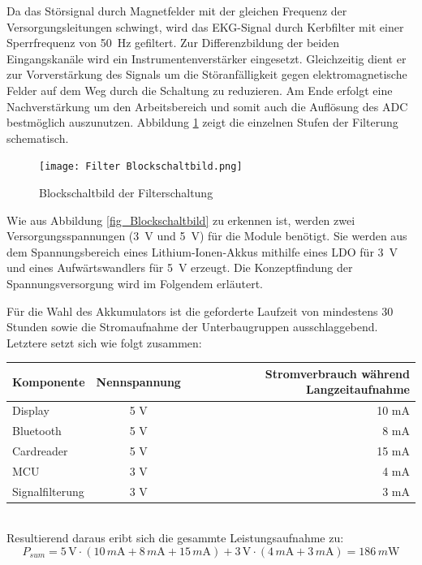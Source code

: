 Da das Störsignal durch Magnetfelder mit der gleichen Frequenz der Versorgungsleitungen schwingt, wird das EKG-Signal durch Kerbfilter mit einer Sperrfrequenz von \SI{50}{\hertz} gefiltert. Zur Differenzbildung der beiden Eingangskanäle wird ein Instrumentenverstärker eingesetzt. Gleichzeitig dient er zur Vorverstärkung des Signals um die Störanfälligkeit gegen elektromagnetische Felder auf dem Weg durch die Schaltung zu reduzieren. Am Ende erfolgt eine Nachverstärkung um den Arbeitsbereich und somit auch die Auflösung des ADC bestmöglich auszunutzen. Abbildung \ref{fig_Blockschaltbild Filter} zeigt die einzelnen Stufen der Filterung schematisch.

\begin{figure} [!h]
	\texttt{[image: Filter Blockschaltbild.png]}
	\caption{Blockschaltbild der Filterschaltung}
	\label{fig_Blockschaltbild Filter} 
\end{figure}

Wie aus Abbildung \ref{fig_Blockschaltbild} zu erkennen ist, werden zwei Versorgungsspannungen (\SI{3}{\volt}  und \SI{5}{\volt}) für die Module benötigt. Sie werden aus dem Spannungsbereich eines Lithium-Ionen-Akkus mithilfe eines LDO für \SI{3}{\volt} und eines Aufwärtswandlers für \SI{5}{\volt} erzeugt. Die Konzeptfindung der Spannungsversorgung wird im Folgendem erläutert.

Für die Wahl des Akkumulators ist die geforderte Laufzeit von mindestens 30 Stunden sowie die Stromaufnahme der Unterbaugruppen ausschlaggebend. Letztere setzt sich wie folgt zusammen:\\

\begin{tabular}[h]{l|c|r}
Komponente & Nennspannung & Stromverbrauch während Langzeitaufnahme\\
\hline
Display & 5 V & 10 mA \\
Bluetooth & 5 V & 8 mA \\
Cardreader & 5 V & 15 mA \\
MCU & 3 V & 4 mA \\
Signalfilterung & 3 V & 3 mA \\
\end{tabular}\\

Resultierend daraus eribt sich die gesammte Leistungsaufnahme zu: 
\[ P_{sum} = 5\,\mbox{V} \cdot (10\,m \mbox{A} + 8\,m\mbox{A} + 15\,m\mbox{A}) + 3\,\mbox{V} \cdot (4\, m\mbox{A} + 3 \,m\mbox{A}) = 186\, m\mbox{W} \]

